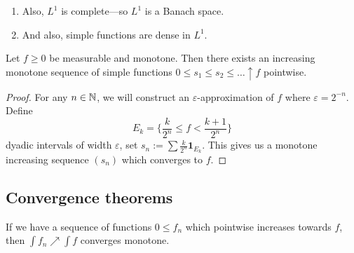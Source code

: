 \begin{remark}
\begin{enumerate}
\item Also, $L^{1}$ is complete---so $L^{1}$ is a Banach space.
\item And also, simple functions are dense in $L^{1}$.
\end{enumerate}
\end{remark}

\begin{claim}
Let $f\geq0$ be measurable and monotone. Then there exists an
increasing monotone sequence of simple functions $0\leq s_{1}\leq s_{2}\leq\dots\uparrow f$
pointwise.
\end{claim}

\begin{proof}
For any $n\in\mathbb{N}$, we will construct an $\varepsilon$-approximation of
$f$ where $\varepsilon=2^{-n}$. Define
\begin{equation}
E_{k}=\{\frac{k}{2^{n}}\leq f<\frac{k+1}{2^{n}}\}
\end{equation}
dyadic intervals of width $\varepsilon$, set
$s_{n}:=\sum\frac{k}{2^{n}}\mathbf{1}_{E_{k}}$.
This gives us a monotone increasing sequence $(s_{n})$ which converges
to $f$.
\end{proof}

\subsection{Convergence theorems}

\begin{monotone-convergence-theorem}[Levy]
If we have a sequence of functions $0\leq f_{n}$ which pointwise
increases towards $f$, then $\int f_{n}\nearrow\int f$ converges monotone.
\end{monotone-convergence-theorem}

